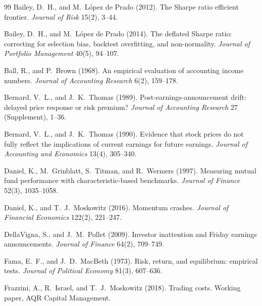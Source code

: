 \documentclass[11pt]{article}
\theoremstyle{definition}
\newcommand{\1}{\mathbf{1}}
\begin{document}
\begin{thebibliography}{99}\small
Bailey, D.~H., and M.~L\'opez de Prado (2012). The Sharpe ratio efficient frontier.
\textit{Journal of Risk} 15(2), 3--44.

Bailey, D.~H., and M.~L\'opez de Prado (2014). The deflated Sharpe ratio: correcting for selection bias,
backtest overfitting, and non-normality. \textit{Journal of Portfolio Management} 40(5), 94--107.

Ball, R., and P.~Brown (1968). An empirical evaluation of accounting income numbers.
\textit{Journal of Accounting Research} 6(2), 159--178.

Bernard, V.~L., and J.~K.~Thomas (1989). Post-earnings-announcement drift: delayed price
response or risk premium? \textit{Journal of Accounting Research} 27 (Supplement), 1--36.

Bernard, V.~L., and J.~K.~Thomas (1990). Evidence that stock prices do not fully reflect
the implications of current earnings for future earnings. \textit{Journal of Accounting and
Economics} 13(4), 305--340.

Daniel, K., M.~Grinblatt, S.~Titman, and R.~Wermers (1997). Measuring mutual fund
performance with characteristic-based benchmarks. \textit{Journal of Finance} 52(3),
1035--1058.

Daniel, K., and T.~J.~Moskowitz (2016). Momentum crashes. \textit{Journal of Financial
Economics} 122(2), 221--247.

DellaVigna, S., and J.~M.~Pollet (2009). Investor inattention and Friday earnings
announcements. \textit{Journal of Finance} 64(2), 709--749.

Fama, E.~F., and J.~D.~MacBeth (1973). Risk, return, and equilibrium: empirical tests.
\textit{Journal of Political Economy} 81(3), 607--636.

Frazzini, A., R.~Israel, and T.~J.~Moskowitz (2018). Trading costs. Working paper, AQR
Capital Management.


\end{thebibliography}
\end{document}
